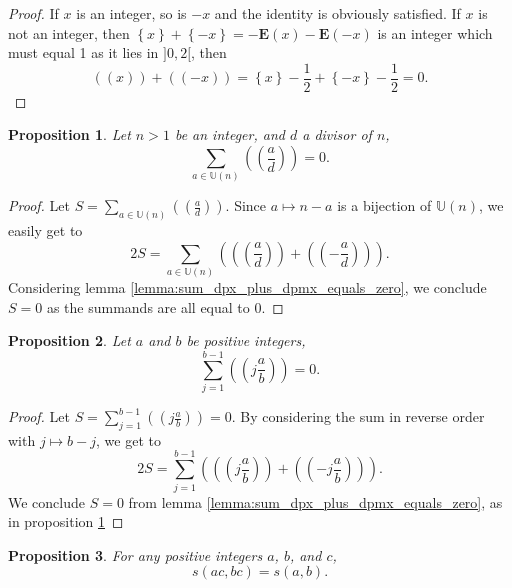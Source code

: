 \documentclass[a4paper,12pt]{article}
\newtheorem{proposition}{Proposition}[section]
\newcommand{\IP}[1]{\textbf{E}\left( #1 \right)}
\newcommand{\FP}[1]{\left\{ #1 \right\}}
\newcommand{\setU}[1]{\mathbb{U}\left( #1 \right)}
\newcommand{\doubleparii}[1]{\left(\!\!\left(#1\right)\!\!\right)}
\newcommand{\doublepari}[1]{\left(\!\left(#1\right)\!\right)}
\begin{document}
\begin{proof} If $x$ is an integer, so is $-x$ and the identity is obviously satisfied. 
If $x$ is not an integer, then $\FP{x}+\FP{-x}=-\IP{x}-\IP{-x}$ is an integer which must equal 1 as it lies in $]0,2[$, then
\begin{equation*}
\doublepari{x}+\doublepari{-x}=\FP{x}-\frac{1}{2}+\FP{-x}-\frac{1}{2}=0.
\end{equation*}
\end{proof}

\begin{proposition}\label{prop:sum_a_in_Un_dp_a_over_d_equal_zero} Let $n>1$ be an integer, and $d$ a divisor of $n$,
\begin{equation}
\sum_{a \in \setU{n}} \doubleparii{\frac{a}{d}} = 0.
\end{equation}
\end{proposition}

\begin{proof} Let $S=\sum_{a \in \setU{n}} \doublepari{\frac{a}{d}}$. Since $a\mapsto n-a$ is a bijection of $\setU{n}$, we easily get to
\begin{equation*}
2S=\sum_{a \in \setU{n}} \left( \doubleparii{\frac{a}{d}} + \doubleparii{-\frac{a}{d}} \right).
\end{equation*}
Considering lemma \ref{lemma:sum_dpx_plus_dpmx_equals_zero}, we conclude $S=0$ as the summands are all equal to 0.
\end{proof}

\begin{proposition}\label{prop:sum_j1bm1_dpjaoverb_equal_zero} Let $a$ and $b$ be positive integers,
\begin{equation}
\sum_{j=1}^{b-1} \doubleparii{j\frac{a}{b}} = 0.
\end{equation}
\end{proposition}

\begin{proof} Let $S=\sum_{j=1}^{b-1} \doubleparii{j\frac{a}{b}} = 0$. By considering the sum in reverse order with $j\mapsto b-j$, we get to
\begin{equation*}
2S=\sum_{j=1}^{b-1} \left( \doubleparii{j\frac{a}{b}} + \doubleparii{-j\frac{a}{b}} \right).
\end{equation*}
We conclude $S=0$ from lemma \ref{lemma:sum_dpx_plus_dpmx_equals_zero}, as in proposition \ref{prop:sum_a_in_Un_dp_a_over_d_equal_zero}
\end{proof}

\begin{proposition}\label{prop:sab_equals_sacbc} For any positive integers $a$, $b$, and $c$,
\begin{equation}
s(ac,bc)=s(a,b).
\end{equation}
\end{proposition}
\end{document}
